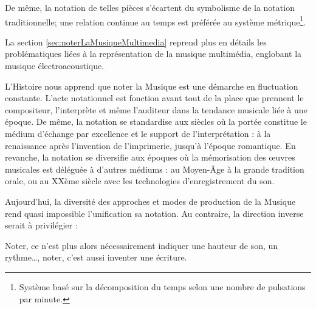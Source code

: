 De même, la notation de telles pièces s'écartent du symbolisme de la notation traditionnelle; une relation continue au temps est préférée au système métrique\footnote{Système basé sur la décomposition du temps selon une nombre de pulsations par minute.}.

La section \ref{sec:noterLaMusiqueMultimedia} reprend plus en détails les problématiques liées à la représentation de la musique multimédia, englobant la musique électroacoustique. 

\bigskip

L'Histoire nous apprend que noter la Musique est une démarche en fluctuation constante. L'acte notationnel est fonction avant tout de la place que prennent le compositeur, l'interprète et même l'auditeur dans la tendance musicale liée à une époque.
De même, la notation se standardise aux siècles où la portée constitue le médium d'échange par excellence et le support de l'interprétation : à la renaissance après l'invention de l'imprimerie, jusqu'à l'époque romantique.
En revanche, la notation se diversifie aux époques où la mémorisation des œuvres musicales est déléguée à d'autres médiums : au Moyen-Âge à la grande tradition orale, ou au XXème siècle avec les technologies d'enregistrement du son.   

Aujourd'hui, la diversité des approches et modes de production de la Musique rend quasi impossible l'unification sa notation.
Au contraire, la direction inverse serait à privilégier :
\begin{displayquote}
\og Noter, ce n'est plus alors nécessairement indiquer une hauteur de son, un rythme…, noter, c'est aussi inventer une écriture.\fg 
\end{displayquote} 

